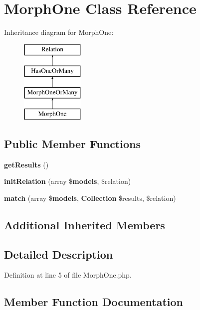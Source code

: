 \section{Morph\+One Class Reference}
\label{class_illuminate_1_1_database_1_1_eloquent_1_1_relations_1_1_morph_one}
Inheritance diagram for Morph\+One\+:\begin{figure}[H]
\begin{center}
\leavevmode
\includegraphics[height=4.000000cm]{class_illuminate_1_1_database_1_1_eloquent_1_1_relations_1_1_morph_one}
\end{center}
\end{figure}
\subsection*{Public Member Functions}
\begin{DoxyCompactItemize}
\item 
{\bf get\+Results} ()
\item 
{\bf init\+Relation} (array \${\bf models}, \$relation)
\item 
{\bf match} (array \${\bf models}, {\bf Collection} \$results, \$relation)
\end{DoxyCompactItemize}
\subsection*{Additional Inherited Members}


\subsection{Detailed Description}


Definition at line 5 of file Morph\+One.\+php.



\subsection{Member Function Documentation}
